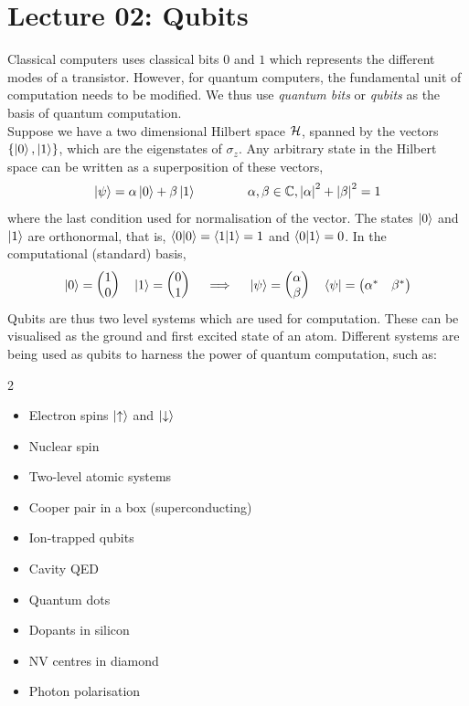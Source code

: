 \section*{Lecture 02: Qubits}
Classical computers uses classical bits $0$ and $1$ which represents the different modes of a transistor. However, for quantum computers, the fundamental unit of computation needs to be modified. We thus use \textit{quantum bits} or \textit{qubits} as the basis of quantum computation.\\[0.2cm] Suppose we have a two dimensional Hilbert space $\mathcal H$, spanned by the vectors $\{\ket{0}, \ket{1}\}$, which are the eigenstates of $\sigma_z$. Any arbitrary state in the Hilbert space can be written as a superposition of these vectors,
$$\ket{\psi} = \alpha \ket{0} + \beta\ket{1}\qquad\qquad \alpha,\beta\in \mathbb{C}, \abs{\alpha}^2+\abs{\beta}^2=1$$
where the last condition used for normalisation of the vector. The states $\ket{0}$ and $\ket{1}$ are orthonormal, that is, $\braket{0|0} = \braket{1|1}=1$ and $\braket{0|1}=0$. In the computational (standard) basis, 
\begin{equation}\label{standard}
    \ket{0} = \mqty(1\\0) \quad \ket{1} = \mqty(0\\1)\quad\implies\quad \ket{\psi} = \mqty(\alpha\\\beta)\quad \bra{\psi} = \mqty(\alpha^* & \beta^*) 
\end{equation}
Qubits are thus two level systems which are used for computation. These can be visualised as the ground and first excited state of an atom. Different systems are being used as qubits to harness the power of quantum computation, such as:
\begin{multicols}{2}
    \begin{itemize}
        \item Electron spins $\ket{\uparrow}$ and $\ket{\downarrow}$
        \item Nuclear spin
        \item Two-level atomic systems
        \item Cooper pair in a box (superconducting)
        \item Ion-trapped qubits
        \item Cavity QED
        \item Quantum dots
        \item Dopants in silicon
        \item NV centres in diamond 
        \item Photon polarisation
    \end{itemize}
    \end{multicols}

